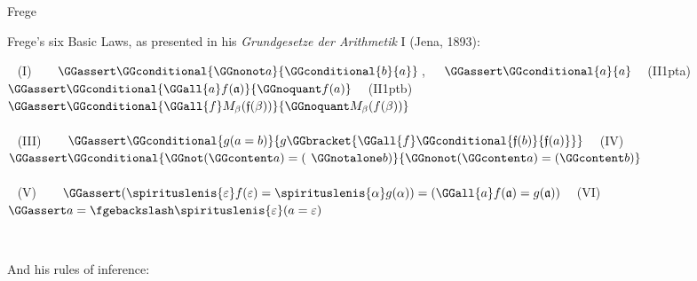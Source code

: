 



\maketitle

\begin{entry}{Frege}  

\begin{calculus}

Frege's six Basic Laws, as presented in his \emph{Grundgesetze der Arithmetik} I (Jena, 1893):\\

{\centering

~ \hfill (I) ~ ~ $\GGassert\GGconditional{\GGnonot a}{\GGconditional{b}{a}}$\,,~~~$\GGassert\GGconditional{a}{a}$ 
~ \hfill (II\kern1pta) ~ ~  $\GGassert\GGconditional{\GGall{a}f(\mathfrak{a})}{\GGnoquant f(a)}$
~ \hfill (II\kern1ptb) ~ ~ $\GGassert\GGconditional{\GGall{f} M_\beta({\mathfrak{f}(\beta))}}{\GGnoquant M_\beta(f(\beta))}$ \hfill ~\\

~\\[1ex]

~ \hfill (III) ~ ~ $\GGassert\GGconditional{g(a=b)}{g\GGbracket{\GGall{f}\GGconditional{\mathfrak{f}(b)}{\mathfrak{f}(a)}}}$ 
~ \hfill (IV) ~ ~ $\GGassert\GGconditional{\GGnot(\GGcontent a) = (\kern4pt\GGnotalone b)}{\GGnonot(\GGcontent a) = (\GGcontent b)}$ \hfill ~\\

~\\[1ex]

~ \hfill (V) ~ ~ $\GGassert (\spirituslenis{\varepsilon} f(\varepsilon) = \spirituslenis{\alpha} g(\alpha)) =  (\GGall{a} f(\mathfrak{a}) = g(\mathfrak{a}))$ ~ \hfill (VI) ~ ~ 
$\GGassert a = \fgebackslash\spirituslenis{\varepsilon} (a = \varepsilon)$\hfill ~
}

~

And his rules of inference:\\[-1ex]



\end{calculus}
\end{entry}
